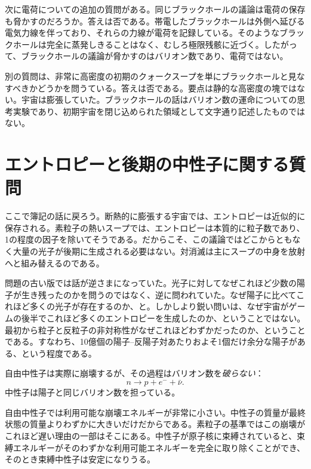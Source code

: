 次に電荷についての追加の質問がある。同じブラックホールの議論は電荷の保存も脅かすのだろうか。答えは否である。帯電したブラックホールは外側へ延びる電気力線を伴っており、それらの力線が電荷を記録している。そのようなブラックホールは完全に蒸発しきることはなく、むしろ極限残骸に近づく。したがって、ブラックホールの議論が脅かすのはバリオン数であり、電荷ではない。

別の質問は、非常に高密度の初期のクォークスープを単にブラックホールと見なすべきかどうかを問うている。答えは否である。要点は静的な高密度の塊ではない。宇宙は膨張していた。ブラックホールの話はバリオン数の運命についての思考実験であり、初期宇宙を閉じ込められた領域として文字通り記述したものではない。

\begin{classroomqa}
\end{classroomqa}

\section{エントロピーと後期の中性子に関する質問}

ここで簿記の話に戻ろう。断熱的に膨張する宇宙では、エントロピーは近似的に保存される。素粒子の熱いスープでは、エントロピーは本質的に粒子数であり、1の程度の因子を除いてそうである。だからこそ、この議論ではどこからともなく大量の光子が後期に生成される必要はない。対消滅は主にスープの中身を放射へと組み替えるのである。

問題の古い版では話が逆さまになっていた。光子に対してなぜこれほど少数の陽子が生き残ったのかを問うのではなく、逆に問われていた。なぜ陽子に比べてこれほど多くの光子が存在するのか、と。しかしより鋭い問いは、なぜ宇宙がゲームの後半でこれほど多くのエントロピーを生成したのか、ということではない。最初から粒子と反粒子の非対称性がなぜこれほどわずかだったのか、ということである。すなわち、10億個の陽子--反陽子対あたりおよそ1個だけ余分な陽子がある、という程度である。

自由中性子は実際に崩壊するが、その過程はバリオン数を\emph{破らない}：
\[
n \to p + e^- + \bar\nu.
\]
中性子は陽子と同じバリオン数を担っている。

自由中性子では利用可能な崩壊エネルギーが非常に小さい。中性子の質量が最終状態の質量よりわずかに大きいだけだからである。素粒子の基準ではこの崩壊がこれほど遅い理由の一部はそこにある。中性子が原子核に束縛されていると、束縛エネルギーがそのわずかな利用可能エネルギーを完全に取り除くことができ、そのとき束縛中性子は安定になりうる。

\begin{classroomqa}
\end{classroomqa}
